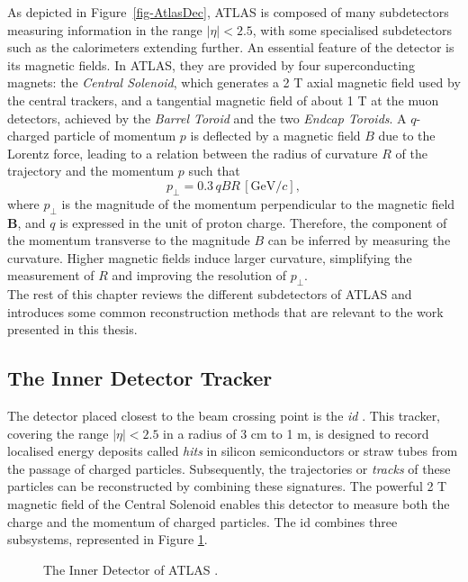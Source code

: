As depicted in Figure~\ref{fig-AtlasDec}, ATLAS is composed of many subdetectors measuring information in the range $|\eta|<  2.5$, with some specialised subdetectors such as the calorimeters extending further. An essential feature of the detector is its magnetic fields. In ATLAS, they are provided by four superconducting magnets: the \textit{Central Solenoid}, which generates a 2 T axial magnetic field used by the central trackers, and a tangential magnetic field of about 1 T at the muon detectors, achieved by the \textit{Barrel Toroid} and the two \textit{Endcap Toroids}. A $q$-charged particle of momentum $p$ is deflected by a magnetic field $B$ due to the Lorentz force, leading to a relation between the radius of curvature $R$ of the trajectory and the momentum $p$ such that 
\begin{equation}
  p_{\perp} = 0.3 \, qBR \, [\text{GeV}/c],
\end{equation}
where $p_{\perp}$ is the magnitude of the momentum perpendicular to the magnetic field $\boldsymbol{B}$, and $q$ is expressed in the unit of proton charge. Therefore, the component of the momentum transverse to the magnitude $B$ can be inferred by measuring the curvature. Higher magnetic fields induce larger curvature, simplifying the measurement of $R$ and improving the resolution of $p_{\perp}$. \\ 

The rest of this chapter reviews the different subdetectors of ATLAS and introduces some common reconstruction methods that are relevant to the work presented in this thesis. 

\subsection{The Inner Detector Tracker}
The detector placed closest to the beam crossing point is the \textit{\gls{id}} \cite{CERN-LHCC-97-016}. This tracker, covering the range $|\eta| < 2.5$ in a radius of 3 cm to 1 m, is designed to record localised energy deposits called \textit{hits} in silicon semiconductors or straw tubes from the passage of charged particles. Subsequently, the trajectories or \textit{tracks} of these particles can be reconstructed by combining these signatures. The powerful 2 T magnetic field of the Central Solenoid enables this detector to measure both the charge and the momentum of charged particles. The \gls{id} combines three subsystems, represented in Figure \ref{fig-AtlasDecID}. 

\begin{figure}[!h]
  \centering
  \hspace{-1.25cm}
  \caption{The Inner Detector of ATLAS \cite{ATLASschematics}.}
  \label{fig-AtlasDecID}
\end{figure}

